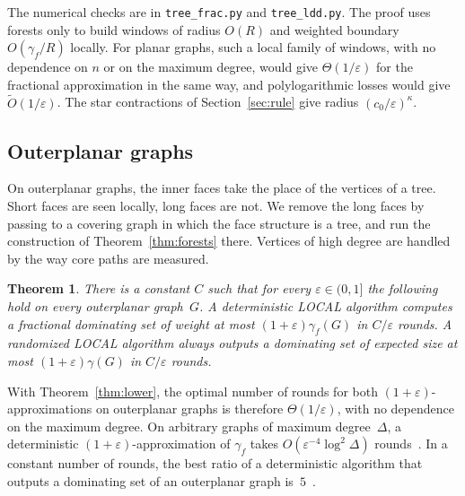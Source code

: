 \documentclass[11pt]{article}
\newtheorem{theorem}{Theorem}
\theoremstyle{remark}
\begin{document}
The numerical checks are in \texttt{tree\_frac.py} and \texttt{tree\_ldd.py}. The proof uses
forests only to build windows of radius $O(R)$ and weighted boundary $O(\gamma_f/R)$ locally. For planar graphs,
such a local family of windows, with no dependence on $n$ or on the maximum degree, would give
$\Theta(1/\varepsilon)$ for the fractional approximation in the same way, and polylogarithmic losses would give
$\tilde O(1/\varepsilon)$. The star contractions of Section~\ref{sec:rule} give radius
$(c_0/\varepsilon)^{\kappa}$.

\subsection{Outerplanar graphs}\label{sec:outerplanar}

On outerplanar graphs, the inner faces take the place of the vertices of a tree. Short faces are
seen locally, long faces are not. We remove the long faces by passing to a covering graph in which
the face structure is a tree, and run the construction of Theorem~\ref{thm:forests} there. Vertices
of high degree are handled by the way core paths are measured.

\begin{theorem}\label{thm:outerplanar}
There is a constant $C$ such that for every $\varepsilon\in(0,1]$ the following hold on every
outerplanar graph~$G$. A deterministic LOCAL algorithm computes a fractional dominating set of
weight at most $(1+\varepsilon)\gamma_f(G)$ in $C/\varepsilon$ rounds. A randomized LOCAL algorithm
always outputs a dominating set of expected size at most $(1+\varepsilon)\gamma(G)$ in
$C/\varepsilon$ rounds.
\end{theorem}

With Theorem~\ref{thm:lower}, the optimal number of rounds for both $(1+\varepsilon)$-approximations
on outerplanar graphs is therefore $\Theta(1/\varepsilon)$, with no dependence on the maximum
degree. On arbitrary graphs of maximum degree~$\Delta$, a deterministic $(1+\varepsilon)$-approximation
of $\gamma_f$ takes $O(\varepsilon^{-4}\log^2\Delta)$ rounds~\cite{KMW06}. In a constant number of
rounds, the best ratio of a deterministic algorithm that outputs a dominating set of an outerplanar
graph is~$5$~\cite{BCGW21}.
\end{document}
